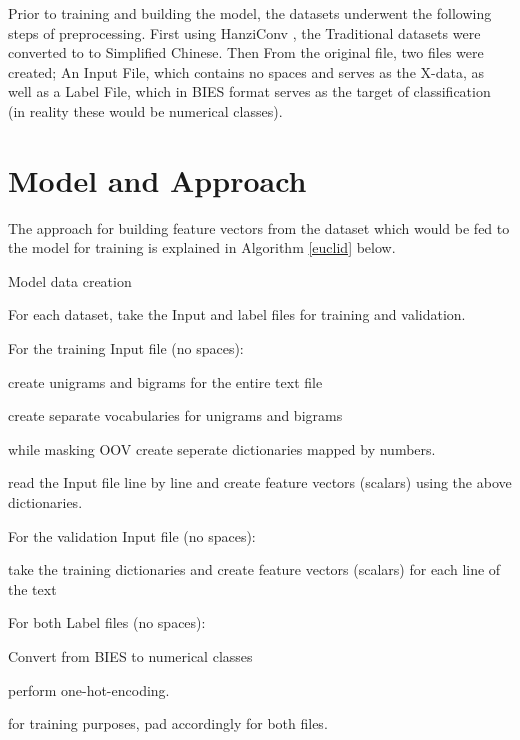 \documentclass[12pt,a4paper]{article}
\begin{document}
Prior to training and building the model, the datasets underwent the following steps of preprocessing. First using HanziConv \cite{hanzi}, the Traditional datasets were converted to to Simplified Chinese. Then From the original file, two files were created; An Input File, which contains no spaces and serves as the X-data, as well as a Label File, which in BIES format serves as the target of classification (in reality these would be numerical classes). 

\section{Model and Approach}
The approach for building feature vectors from the dataset which would be fed to the model for training is explained in Algorithm \ref{euclid} below.

\begin{algorithm}
\caption{Model data creation}\label{euclid}
\begin{algorithmic}[1]
\item For each dataset, take the Input and label files for training and validation.

\item For the training Input file (no spaces):
\begin{algorithmic}[1]
\item create unigrams and bigrams for the entire text file
\item create separate vocabularies for unigrams and bigrams
\item while masking OOV create seperate dictionaries mapped by numbers.
\item read the Input file line by line and create feature vectors  (scalars) using the above dictionaries.
\end{algorithmic}

\item For the validation Input file (no spaces):
\begin{algorithmic}[1]
\item take the training dictionaries and create  feature vectors  (scalars) for each line of the text
\end{algorithmic}

\item For both Label files (no spaces):
\begin{algorithmic}[1]
\item Convert from BIES to numerical classes
\item perform one-hot-encoding.
\end{algorithmic}

\item for training purposes, pad accordingly for both files.

\end{algorithmic}
\end{algorithm}
\end{document}
